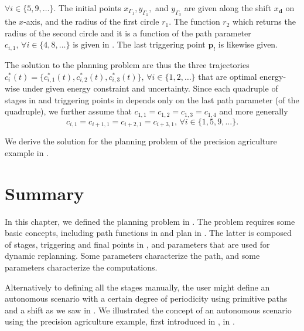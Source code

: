 $\forall i\in\{5,9,\dots\}$. The initial points $x_{\Gamma_1},y_{\Gamma_1},$ and $y_{\Gamma_3}$ are given along the shift $x_\mathbf{d}$ on the $x$-axis, and the radius of the first circle $r_1$. The function $r_2$ which returns the radius of the second circle and it is a function of the path parameter $c_{i,1},\,\forall i\in\{4,8,\dots\}$ is given in . The last triggering point $\mathbf{p}_l$ is likewise given.

The solution to the planning problem are thus the three trajectories $c_i^*(t)=\{c_{i,1}^*(t),c_{i,2}^*(t),c_{i,3}^*(t)\},\,\forall i\in\{1,2,\dots\}$ that are optimal energy-wise under given energy constraint and uncertainty. 
Since each quadruple of stages in  and triggering points in  depends only on the last path parameter (of the quadruple), we further assume that $c_{1,1}=c_{1,2}=c_{1,3}=c_{1,4}$ and more generally 
\begin{equation}
c_{i,1}=c_{i+1,1}=c_{i+2,1}=c_{i+3,1},\,\forall i\in\{1,5,9,\dots\}.
\end{equation}

We derive the solution for the planning problem of the precision agriculture example in .


\section{Summary}

In this chapter, we defined the planning problem in . The problem requires some basic concepts, including path functions in  and plan in . The latter is composed of stages, triggering and final points in , and parameters that are used for dynamic replanning. Some parameters characterize the path, and some parameters characterize the computations.

Alternatively to defining all the stages manually, the user might define an autonomous scenario with a certain degree of periodicity using primitive paths and a shift as we saw in . We illustrated the concept of an autonomous scenario using the precision agriculture example, first introduced in , in .
